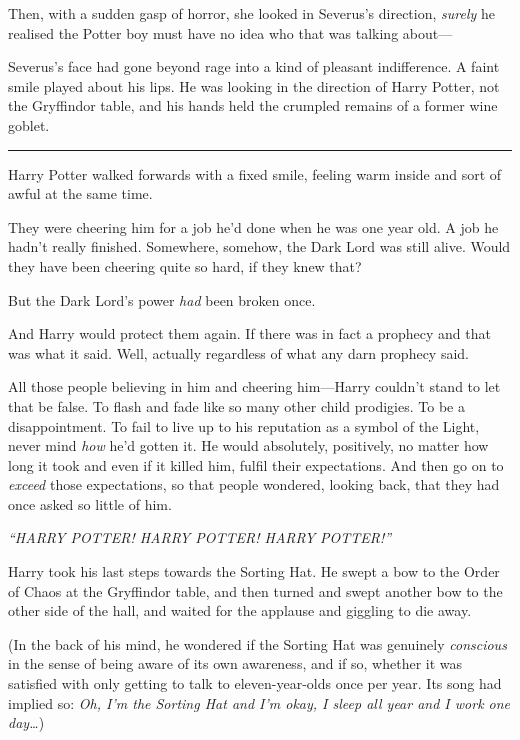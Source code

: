 Then, with a sudden gasp of horror, she looked in Severus's direction,
\emph{surely} he realised the Potter boy must have no idea who that was
talking about---

Severus's face had gone beyond rage into a kind of pleasant
indifference. A faint smile played about his lips. He was looking in the
direction of Harry Potter, not the Gryffindor table, and his hands held
the crumpled remains of a former wine goblet.

\begin{center}\rule{3in}{0.4pt}\end{center}

Harry Potter walked forwards with a fixed smile, feeling warm inside and
sort of awful at the same time.

They were cheering him for a job he'd done when he was one year old. A
job he hadn't really finished. Somewhere, somehow, the Dark Lord was
still alive. Would they have been cheering quite so hard, if they knew
that?

But the Dark Lord's power \emph{had} been broken once.

And Harry would protect them again. If there was in fact a prophecy and
that was what it said. Well, actually regardless of what any darn
prophecy said.

All those people believing in him and cheering him---Harry couldn't
stand to let that be false. To flash and fade like so many other child
prodigies. To be a disappointment. To fail to live up to his reputation
as a symbol of the Light, never mind \emph{how} he'd gotten it. He would
absolutely, positively, no matter how long it took and even if it killed
him, fulfil their expectations. And then go on to \emph{exceed} those
expectations, so that people wondered, looking back, that they had once
asked so little of him.

\emph{``HARRY POTTER! HARRY POTTER! HARRY POTTER!''}

Harry took his last steps towards the Sorting Hat. He swept a bow to the
Order of Chaos at the Gryffindor table, and then turned and swept
another bow to the other side of the hall, and waited for the applause
and giggling to die away.

(In the back of his mind, he wondered if the Sorting Hat was genuinely
\emph{conscious} in the sense of being aware of its own awareness, and
if so, whether it was satisfied with only getting to talk to
eleven-year-olds once per year. Its song had implied so: \emph{Oh, I'm
the Sorting Hat and I'm okay, I sleep all year and I work one
day\ldots{}})

